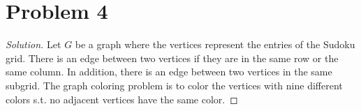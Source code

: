 \documentclass[12pt]{article}
\newenvironment*{solution}{\begin{proof}[Solution]}{\end{proof}}
\begin{document}
\section*{Problem 4}
\begin{solution}
    Let \(G\) be a graph where the vertices represent the entries of the
    Sudoku grid. There is an edge between two vertices if they are in the same
    row or the same column. In addition, there is an edge between two vertices
    in the same subgrid. The graph coloring problem is to color the vertices
    with nine different colors s.t. no adjacent vertices have the same color.
\end{solution}
\end{document}
